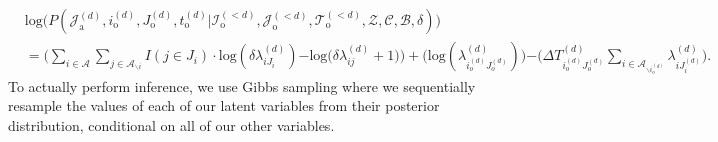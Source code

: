 \documentclass[a4paper]{article}
\begin{document}
 \begin{equation}
 \begin{aligned}
 &\mbox{log}\Big(P(\mathcal{J}^{(d)}_{\mbox{a}}, i^{(d)}_{\mbox{o}}, J^{(d)}_{\mbox{o}}, t^{(d)}_{\mbox{o}} |\mathcal{I}^{(<d)}_{\mbox{o}}, \mathcal{J}^{(<d)}_{\mbox{o}}, \mathcal{T}^{(<d)}_{\mbox{o}}, \mathcal{Z}, \mathcal{C}, \mathcal{B},  \delta)\Big)\\&=\Big(\sum_{i\in \mathcal{A}}\sum_{j \in \mathcal{A}_{\backslash i }} {I(j \in J_i)}\cdot\mbox{log}(\delta\lambda^{(d)}_{iJ_i}) {-\mbox{log}(\delta\lambda^{(d)}_{ij}}+1)\Big)+ \Big(\mbox{log}(\lambda^{(d)}_{i_o^{(d)}J_o^{(d)}})\Big) {-\Big(\Delta T^{(d)}_{i_o^{(d)}J_o^{(d)}}\sum\limits_{i \in \mathcal{A}_{\backslash i_o^{(d)}} }\lambda^{(d)}_{i{J_i^{(d)}}}\Big)}.
 \end{aligned}
 \end{equation}
 To actually perform inference, we use Gibbs sampling where we sequentially resample the values of each of our latent variables from their posterior distribution, conditional on all of our other variables.
\end{document}
